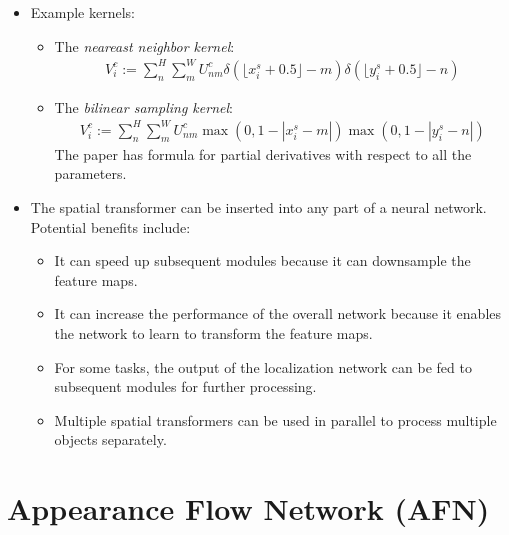 \documentclass[10pt]{article}
\begin{document}
\begin{itemize}
 	\item Example kernels:
 	\begin{itemize}
 		\item The \emph{neareast neighbor kernel}:
 		\begin{align*}
 		 	V_i^c := \sum_{n}^H \sum_{m}^W U_{nm}^c \delta(\lfloor x_i^s + 0.5 \rfloor - m) \delta(\lfloor y_i^s + 0.5 \rfloor - n)
 		\end{align*}
 		\item The \emph{bilinear sampling kernel}:
 		\begin{align*}
 			V_i^c := \sum_{n}^H \sum_{m}^W U_{nm}^c \max(0, 1 - |x_i^s - m|) \max(0, 1 - |y_i^s - n|)
 		\end{align*}
 		The paper \cite{Jaderberg:2015} has formula for partial derivatives with respect to all the parameters.
 	\end{itemize}

 	\item The spatial transformer can be inserted into any part of a neural network. Potential benefits include:
 	\begin{itemize}
 		\item It can speed up subsequent modules because it can downsample the feature maps.

 		\item It can increase the performance of the overall network because it enables the network to learn to transform the feature maps.

 		\item For some tasks, the output of the localization network can be fed to subsequent modules for further processing.

 		\item Multiple spatial transformers can be used in parallel to process multiple objects separately.
 	\end{itemize}
  \end{itemize}

  \section{Appearance Flow Network (AFN)}
\end{document}
